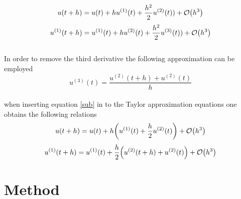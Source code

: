 \documentclass[%
reprint,nofootinbib,
amsmath,amssymb,
aps,
]{revtex4-1}
\begin{document}
\begin{equation*}
u(t+h) = u(t) + hu^{(1)}(t) + \dfrac{h^2}{2}u^{(2)}(t)) + \order{h^3}
\end{equation*} 
\begin{equation*}
u^{(1)}(t+h) = u^{(1)}(t) + hu^{(2)}(t) + \dfrac{h^2}{2}u^{(3)}(t)) + \order{h^3}
\end{equation*} \vspace{3mm} \\ 
In order to remove the third derivative the following approximation can be employed \vspace{3mm} \\ 
\begin{equation}\label{sub}
	u^{(3)}(t) = \dfrac{u^{(2)}(t + h) +u^{(2)}(t)}{h}
\end{equation} \vspace{3mm}\\ 
when inserting equation \ref{sub} in to the Taylor approximation equations one obtains the following relations\vspace{3mm} \\ 
\begin{align}\label{vv1}
	u(t+h) = u(t) + h\qty(u^{(1)}(t) + \dfrac{h}{2}u^{(2)}(t)) + \order{h^3} \nonumber \\ 
\end{align} 
\begin{align}\label{vv2}
	u^{(1)}(t+h) = u^{(1)}(t) + \dfrac{h}{2}\qty(u^{(2)}(t + h)+u^{(2)}(t))  + \order{h^3} \nonumber \\ 
\end{align}

\onecolumngrid

\section{Method}
 \vspace{5mm}
 
\twocolumngrid 
 \noindent 
\end{document}
